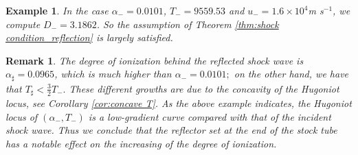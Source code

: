 \documentclass[10pt,a4paper]{article}
\newtheorem{nb}{Remark}[section]
\newtheorem{example}{Example}[section]
\numberwithin{equation}{section}
\begin{document}
\begin{example}
In the case $\alpha_- = 0.0101$, $T_{-} = 9559.53$ and $u_- = 1.6 \times 10^4${\rm m s}${}^{-1}$, we compute $D_-= 3.1862$. So the assumption of Theorem \ref{thm:shock condition_reflection} is largely satisfied.
\end{example}
%
\begin{nb}
The degree of ionization behind the reflected shock wave is  $\alpha_\sharp = 0.0965$, which is much higher than $\alpha_- = 0.0101;$ on the other hand, we have that $T_\sharp<\frac32 T_-.$ These different growths are due to the concavity of the Hugoniot locus, see Corollary \ref{cor:concave T}. As the above example indicates, the Hugoniot locus of $(\alpha_-, T_-)$ is a low-gradient curve compared with that of the incident shock wave. Thus we conclude that the reflector set at the end of the stock tube has a notable effect on the increasing of the degree of ionization.
\end{nb}
\end{document}
